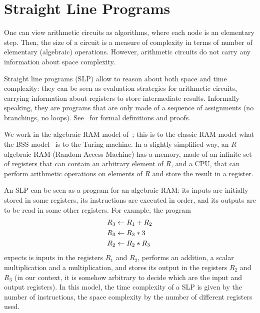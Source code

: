 

\section{Straight Line Programs}
\label{sec:stra-line-progr}

One can view arithmetic circuits as algorithms, where each node is an
elementary step. Then, the size of a circuit is a measure of
complexity in terms of number of elementary (algebraic)
operations. However, arithmetic circuits do not carry any information
about space complexity.

Straight line programs
(SLP) allow to reason about both
space and time complexity: they can be seen as evaluation strategies
for arithmetic circuits, carrying information about registers to store
intermediate results. Informally speaking, they are programs that are
only made of a sequence of assignments (no branchings, no loops).
See~\cite{burgisser+clausen-shokrollahi} for formal definitions and
proofs.

We work in the algebraic RAM model
of~\cite{kaltofen88:gcd}; this is to the classic RAM model what the
BSS model~\cite{BSS} is to the Turing machine. In a slightly
simplified way, an $R$-algebraic RAM (Random Access Machine) has a
memory, made of an infinite set of registers that can contain an
arbitrary element of $R$, and a CPU, that can perform arithmetic
operations on elements of $R$ and store the result in a register.

An SLP can be seen as a program for an algebraic RAM: its inputs are
initially stored in some registers, its instructions are executed in
order, and its outputs are to be read in some other registers. For
example, the program
\begin{equation}
  \label{eq:275}
  \begin{aligned}
    R_3 &\leftarrow R_1 + R_2\\
    R_3 &\leftarrow R_3 * 3\\
    R_2 &\leftarrow R_2 * R_3
  \end{aligned}
\end{equation}
expects is inputs in the registers $R_1$ and $R_2$, performs an
addition, a scalar multiplication and a multiplication, and stores its
output in the registers $R_2$ and $R_3$ (in our context, it is somehow
arbitrary to decide which are the input and output registers). In this
model, the time complexity of a SLP is given by the number of
instructions, the space complexity by the number of different
registers used.



